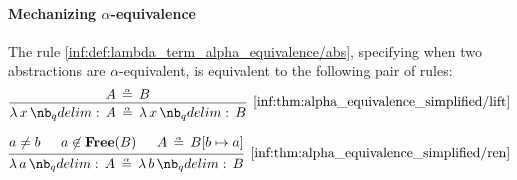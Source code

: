 \paragraph{Mechanizing \( \alpha \)-equivalence}

\begin{proposition}\label{thm:alpha_equivalence_simplified}
  The rule \ref{inf:def:lambda_term_alpha_equivalence/abs}, specifying when two abstractions are \( \alpha \)-equivalent, is equivalent to the following pair of rules:
  \begin{equation*}\taglabel[\ensuremath{ \logic{Lift}_\alpha }]{inf:thm:alpha_equivalence_simplified/lift}
    \begin{prooftree}
      \hypo{ A \aequiv B }
      \infer1[\ref{inf:thm:alpha_equivalence_simplified/lift}]{ \qabs x A \aequiv \qabs x B }
    \end{prooftree}
  \end{equation*}

  \begin{equation*}\taglabel[\ensuremath{ \logic{Ren}_\alpha }]{inf:thm:alpha_equivalence_simplified/ren}
    \begin{prooftree}
      \hypo{ a \neq b }
      \hypo{ a \not\in \op*{Free}(B) }
      \hypo{ A \aequiv B[b \mapsto a] }
      \infer3[\ref{inf:thm:alpha_equivalence_simplified/ren}]{ \qabs a A \aequiv \qabs b B }
    \end{prooftree}
  \end{equation*}
\end{proposition}
